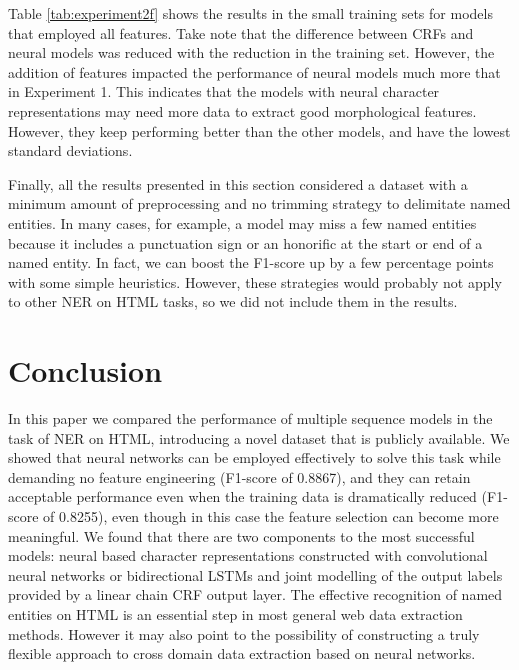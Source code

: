 \documentclass[sigconf]{acmart}
\begin{document}
Table \ref{tab:experiment2f} shows the results in the small training sets 
for models that employed all features. Take note that the difference between CRFs
and neural models was reduced with the reduction in the training set. However, the
addition of features impacted the performance of neural models much more that in 
Experiment 1. This indicates that the models with neural character representations
may need more data to extract good morphological features. However, they keep performing 
better than the other models, and have the lowest standard deviations.

Finally, all the results presented in this section considered a dataset with a minimum
amount of preprocessing and no trimming strategy to delimitate named entities. In many cases, 
for example, a model may miss a few named entities because it includes a punctuation sign
or an honorific at the start or end of a named entity. In fact, we can boost the F1-score up
by a few percentage points with some simple heuristics. However, these strategies would 
probably not apply to other NER on HTML tasks, so we did not include them in the results.

\section{Conclusion}

In this paper we compared the performance of multiple sequence models in the task of
NER on HTML, introducing a novel dataset that is publicly available. We showed that
neural networks can be employed effectively to solve this task while demanding no 
feature engineering (F1-score of 0.8867), and they can retain acceptable performance 
even when the training data is dramatically reduced (F1-score of 0.8255), even though 
in this case the feature selection can become more meaningful. We found that there are 
two components to the most successful models: neural based character representations
constructed with convolutional neural networks or bidirectional LSTMs and joint modelling 
of the output labels provided by a linear chain CRF output layer. The effective recognition 
of named entities on HTML is an essential step in most general web data extraction methods. 
However it may also point to the possibility of constructing a truly flexible approach to
cross domain data extraction based on neural networks.



\end{document}
